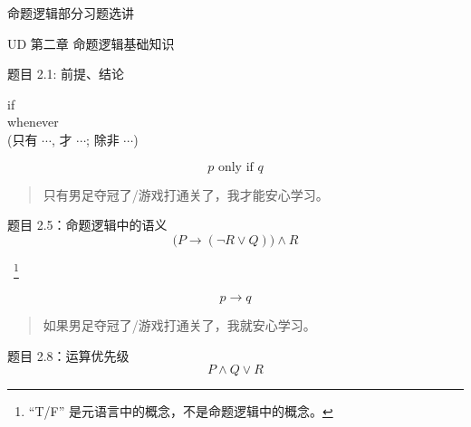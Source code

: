 \begin{frame}{}
  \centerline{\LARGE 命题逻辑部分习题选讲}
  \vspace{0.50cm}
  \centerline{\large UD 第二章 \; 命题逻辑基础知识}
\end{frame}

\begin{frame}{}
  \begin{exampleblock}{题目 2.1: 前提、结论}
    \begin{center}
      if \\[8pt]
      whenever \\[12pt]
       (只有 $\cdots$, 才 $\cdots$; 除非 $\cdots$)
    \end{center}
  \end{exampleblock}

  \[
    p \text{ only if } q
  \]

  \pause
  \vspace{0.80cm}
  \begin{quote}
    \centerline{只有男足夺冠了/游戏打通关了，我才能安心学习。}
  \end{quote}

\end{frame}

\begin{frame}{}
  \begin{exampleblock}{题目 2.5：命题逻辑中的语义}
    \[
      \big(P \to (\lnot R \lor Q)\big) \land R
    \]

    \vspace{0.40cm}
    \centerline{~\footnote{``T/F'' 是元语言中的概念，不是命题逻辑中的概念。}}
  \end{exampleblock}

  \pause

  \[
    p \to q
  \]

  \begin{quote}
    \centerline{如果男足夺冠了/游戏打通关了，我就安心学习。}
  \end{quote}

  \pause
  \begin{exampleblock}{题目 2.8：运算优先级}
    \[
      P \land Q \lor R
    \]
  \end{exampleblock}
\end{frame}

